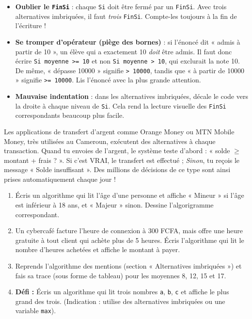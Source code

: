 \documentclass[11pt]{article}
\begin{document}
\begin{attention}
\begin{itemize}
\item \textbf{Oublier le \texttt{FinSi}} : chaque \texttt{Si} doit être fermé par un \texttt{FinSi}. Avec trois alternatives imbriquées, il faut \emph{trois} \texttt{FinSi}. Compte-les toujours à la fin de l'écriture !
\item \textbf{Se tromper d'opérateur (piège des bornes)} : si l'énoncé dit « admis à partir de 10 », un élève qui a exactement 10 \emph{doit} être admis. Il faut donc écrire \texttt{Si moyenne >= 10} et non \texttt{Si moyenne > 10}, qui exclurait la note 10. De même, « dépasse \num{10000} » signifie \texttt{> 10000}, tandis que « à partir de \num{10000} » signifie \texttt{>= 10000}. Lis l'énoncé avec la plus grande attention.
\item \textbf{Mauvaise indentation} : dans les alternatives imbriquées, décale le code vers la droite à chaque niveau de \texttt{Si}. Cela rend la lecture visuelle des \texttt{FinSi} correspondants beaucoup plus facile.
\end{itemize}
\end{attention}

\begin{savaistu}
Les applications de transfert d'argent comme Orange Money ou MTN Mobile Money, très utilisées au Cameroun, exécutent des alternatives à chaque transaction. Quand tu envoies de l'argent, le système teste d'abord : « solde $\geq$ montant + frais ? ». Si c'est VRAI, le transfert est effectué ; \emph{Sinon}, tu reçois le message « Solde insuffisant ». Des millions de décisions de ce type sont ainsi prises automatiquement chaque jour !
\end{savaistu}

\begin{exercice}
\begin{enumerate}
\item Écris un algorithme qui lit l'âge d'une personne et affiche « Mineur » si l'âge est inférieur à 18 ans, et « Majeur » sinon. Dessine l'algorigramme correspondant.
\item Un cybercafé facture l'heure de connexion à 300 FCFA, mais offre une heure gratuite à tout client qui achète plus de 5 heures. Écris l'algorithme qui lit le nombre d'heures achetées et affiche le montant à payer.
\item Reprends l'algorithme des mentions (section « Alternatives imbriquées ») et fais sa trace (sous forme de tableau) pour les moyennes 8, 12, 15 et 17.
\item \textbf{Défi :} Écris un algorithme qui lit trois nombres \texttt{a}, \texttt{b}, \texttt{c} et affiche le plus grand des trois. (Indication : utilise des alternatives imbriquées ou une variable \texttt{max}).
\end{enumerate}
\end{exercice}
\end{document}
